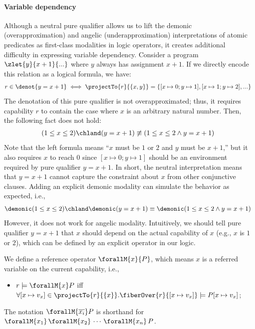 \paragraph{Variable dependency} Although a neutral pure qualifier allows us to lift the demonic (overapproximation) and angelic (underapproximation) interpretations of atomic predicates as first-class modalities in logic operators, it creates additional difficulty in expressing variable dependency. Consider a program $\zlet{y}{x + 1}{...}$ where $y$ always has assignment $x + 1$. If we directly encode this relation as a logical formula, we have:
\begin{align*}
  r \in \denot{y = x + 1} \iff \projectTo{r}{\{x, y\}} = \{ [x \mapsto 0; y \mapsto 1], [x \mapsto 1; y \mapsto 2], ... \}
\end{align*}\noindent
The denotation of this pure qualifier is not overapproximated; thus, it requires capability $r$ to contain the case where $x$ is an arbitrary natural number. Then, the following fact does not hold:
\begin{align*}
  (1 \leq x \leq 2) \chland (y = x + 1) \not\equiv (1 \leq x \leq 2 \land y = x + 1) 
\end{align*}\noindent
Note that the left formula means ``$x$ must be $1$ or $2$ and $y$ must be $x + 1$,'' but it also requires $x$ to reach $0$ since $[x \mapsto 0; y \mapsto 1]$ should be an environment required by pure qualifier $y = x + 1$. In short, the neutral interpretation means that $y = x + 1$ cannot capture the constraint about $x$ from other conjunctive clauses. Adding an explicit demonic modality can simulate the behavior as expected, i.e.,
\begin{align*}
  \demonic (1 \leq x \leq 2) \chland \demonic (y = x + 1) \equiv \demonic (1 \leq x \leq 2 \land y = x + 1) 
\end{align*}\noindent
However, it does not work for angelic modality. Intuitively, we should tell pure qualifier $y = x + 1$ that $x$ should depend on the actual capability of $x$ (e.g., $x$ is $1$ or $2$), which can be defined by an explicit operator in our logic.

\begin{definition}\label{def:context-logic-reference-operator} We define a reference operator $\forallM{x}{P}$, which means $x$ is a referred variable on the current capability, i.e.,
  \begin{itemize}
    \item $r \models \forallM{x}P$ iff $\forall [x\mapsto v_x] \in \projectTo{r}{\{x\}}. \fiberOver{r}{[x\mapsto v_x]} \models P[x\mapsto v_x]$;
  \end{itemize}
The notation $\forallM{\overline{x_i}} P$ is shorthand for
  $\forallM{x_1}\,\forallM{x_2}\,\cdots\,\forallM{x_n}\,P$.
\end{definition}

